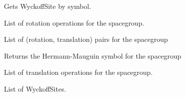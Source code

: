 \documentclass[letterpaper,10pt,english]{sphinxmanual}
\begin{document}
\begin{fulllineitems}
\begin{description}
\end{description}

\begin{fulllineitems}
\label{models:qmpy.Spacegroup.get_site}
Gets WyckoffSite by symbol.

\end{fulllineitems}


\begin{fulllineitems}
\label{models:qmpy.Spacegroup.rotations}
List of rotation operations for the spacegroup.

\end{fulllineitems}


\begin{fulllineitems}
\label{models:qmpy.Spacegroup.sym_ops}
List of (rotation, translation) pairs for the spacegroup

\end{fulllineitems}


\begin{fulllineitems}
\label{models:qmpy.Spacegroup.symbol}
Returns the Hermann-Mauguin symbol for the spacegroup

\end{fulllineitems}


\begin{fulllineitems}
\label{models:qmpy.Spacegroup.translations}
List of translation operations for the spacegroup.

\end{fulllineitems}


\begin{fulllineitems}
\label{models:qmpy.Spacegroup.wyckoff_sites}
List of WyckoffSites.

\end{fulllineitems}


\end{fulllineitems}
\end{document}
